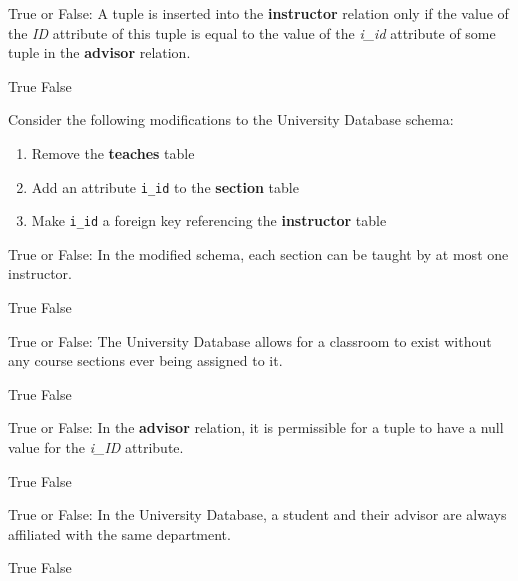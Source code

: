 \documentclass[12pt,answers]{exam}
\begin{document}
\begin{questions}
\begin{minipage}{\linewidth}
\question[2]
True or False: A tuple is inserted into the \textbf{instructor} relation only if the value of the \textit{ID} 
attribute of this tuple is equal to the value of the \textit{i\_id} attribute of some tuple in the \textbf{advisor} relation.
\begin{checkboxes}
    \choice True
    \CorrectChoice False
\end{checkboxes}
\end{minipage}

\begin{minipage}{\linewidth}
\question[3]
Consider the following modifications to the University Database schema:  
\begin{enumerate}[label=\textbullet]
    \item Remove the \textbf{teaches} table
    \item Add an attribute \texttt{i\_id} to the \textbf{section} table
    \item Make \texttt{i\_id} a foreign key referencing the \textbf{instructor} table
\end{enumerate}
True or False: In the modified schema, each section can be taught by at most one instructor.
\begin{checkboxes}
    \CorrectChoice True
    \choice False
\end{checkboxes}
\end{minipage}

\begin{minipage}{\linewidth}
\question[2]
True or False: The University Database allows for a classroom to exist without any course sections ever being assigned to it.
\begin{checkboxes}
    \CorrectChoice True
    \choice False
\end{checkboxes}
\end{minipage}

\begin{minipage}{\linewidth}
\question[2]
True or False: In the \textbf{advisor} relation, it is permissible for a tuple to have a null value for the \textit{i\_ID} attribute.
\begin{checkboxes}
    \CorrectChoice True
    \choice False
\end{checkboxes}
\end{minipage}

\begin{minipage}{\linewidth}
\question[2]
True or False: In the University Database, a student and their advisor are always affiliated with the same department.
\begin{checkboxes}
    \choice True
    \CorrectChoice False
\end{checkboxes}
\end{minipage}

\end{questions}
\end{document}
